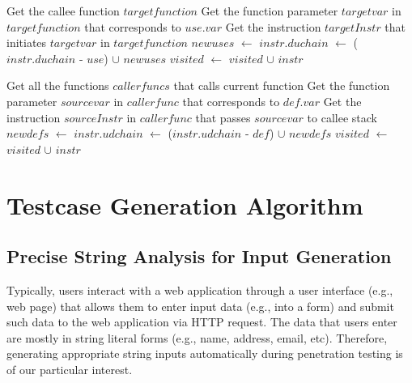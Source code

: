 \begin{algorithm}
\begin{algorithmic}[1]
    \State{}
  \EndIf
      \State Get the callee function $targetfunction$
      \State Get the function parameter $targetvar$ in $targetfunction$ that corresponds to $use.var$
      \State Get the instruction $targetInstr$ that initiates $targetvar$ in $targetfunction$
      \State $newuses$ $\gets$ 
      \State $instr.duchain$ $\gets$ ($instr.duchain$ - $use$) $\cup$ $newuses$
    \EndIf
  \EndFor
  \State $visited$ $\gets$ $visited$ $\cup$ $instr$
  \State{}
\EndFunction
{}
\end{algorithmic}
\end{algorithm}

\begin{algorithm}
\begin{algorithmic}[1]
    \State{}
  \EndIf
      \State Get all the functions $callerfuncs$ that calls current function
        \State Get the function parameter $sourcevar$ in $callerfunc$ that corresponds to $def.var$
        \State Get the instruction $sourceInstr$ in $callerfunc$ that passes $sourcevar$ to callee stack
        \State $newdefs$ $\gets$ 
        \State $instr.udchain$ $\gets$ ($instr.udchain$ - $def$) $\cup$ $newdefs$
      \EndFor
    \EndIf
  \EndFor
  \State $visited$ $\gets$ $visited$ $\cup$ $instr$
  \State{}
\EndFunction
\end{algorithmic}
\end{algorithm}

\section{Testcase Generation Algorithm}

\subsection{Precise String Analysis for Input Generation}
Typically, users interact with a web application through a user interface (e.g., web page) that allows them to enter input data (e.g., into a form) and submit such data to the web application via HTTP request. The data that users enter are mostly in string literal forms (e.g., name, address, email, etc). Therefore, generating appropriate string inputs automatically during penetration testing is of our particular interest.

